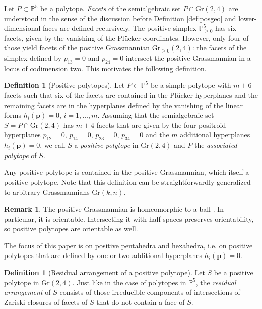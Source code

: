 \documentclass[12pt]{extarticle}
\theoremstyle{definition}
\newtheorem{definition}[theorem]{Definition}
\newtheorem{remark}[theorem]{Remark}
\begin{document}
Let $P \subset \mathbb{P}^5$ be a polytope. \emph{Facets} of the semialgebraic set $P\cap \mathrm{Gr}(2,4)$ are understood in the sense of the discussion before Definition \ref{def:posgeo} and lower-dimensional faces are defined recursively. 
The positive simplex $\mathbb{P}^5_{\geq 0}$ has six facets, given by the vanishing of the Pl\"ucker coordinates. However, only four of those yield facets of the positive Grassmannian $\mathrm{Gr}_{\geq 0}(2,4)$: the facets of the simplex defined by $p_{13} = 0$ and $p_{24} = 0$ intersect the positive Grassmannian in a locus of codimension two. This motivates the following definition. 

\begin{definition}[Positive polytopes]
    Let $P\subset \mathbb{P}^5$ be a simple polytope with $m+6$ facets such that six of the facets are contained in the Pl\"ucker hyperplanes and the remaining facets are in the hyperplanes defined by the vanishing of the linear forms $h_i(\mathbf{p}) = 0$, $i=1,\ldots,m$. Assuming that the semialgebraic set $S = P\cap \mathrm{Gr}(2,4)$ has $m+4$ facets that are given by the four positroid hyperplanes $p_{12}=0$, $p_{14}=0$, $p_{23}=0$, $p_{34}=0$ and the $m$ additional hyperplanes $h_i(\mathbf{p}) = 0$, we call $S$ a \emph{positive polytope} in $\mathrm{Gr}(2,4)$ and $P$ the \emph{associated polytope} of $S$. 
\end{definition}
Any positive polytope is contained in the positive Grassmannian, which itself a positive polytope. Note that this definition can be straightforwardly generalized to arbitrary Grassmannians $\mathrm{Gr}(k,n)$.

\begin{remark}
    The positive Grassmannian is homeomorphic to a ball \cite{galashin2022totally}. In particular, it is orientable. Intersecting it with half-spaces preserves orientability, so positive polytopes are orientable as well.
\end{remark}

The focus of this paper is on positive pentahedra and hexahedra, i.e. on positive polytopes that are defined by one or two additional hyperplanes $h_i(\mathbf{p})=0$.

\begin{definition}[Residual arrangement of a positive polytope]
    Let $S$ be a positive polytope in $\mathrm{Gr}(2,4)$. Just like in the case of polytopes in $\mathbb{P}^5$, the \emph{residual arrangement} of $S$ consists of those irreducible components of intersections of Zariski closures of facets of $S$ that do not contain a face of $S$. 
\end{definition}
\end{document}

